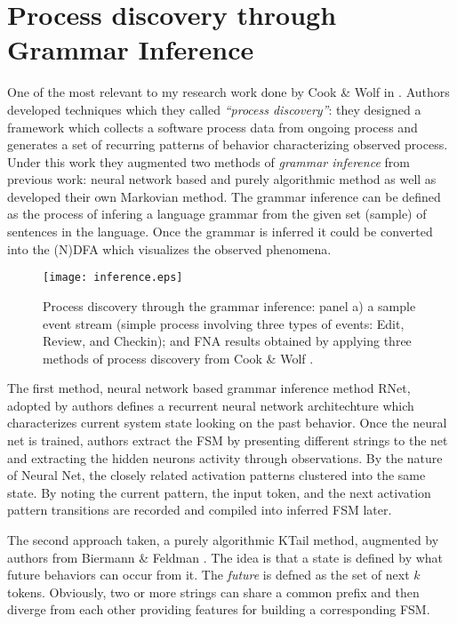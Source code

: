 \section{Process discovery through Grammar Inference}
One of the most relevant to my research work done by Cook \& Wolf in \cite{citeulike:328044}. Authors developed techniques which they called \textit{``process discovery''}: they designed a framework which collects a software process data from ongoing process and generates a set of recurring patterns of behavior characterizing observed process. Under this work they augmented two methods of \textit{grammar inference} from previous work: neural network based and purely algorithmic method as well as developed their own Markovian method. The grammar inference can be defined as the process of infering a language grammar from the given set (sample) of sentences in the language. Once the grammar is inferred it could be converted into the (N)DFA which visualizes the observed phenomena. 

\begin{figure}[tbp]
   \centering
   \texttt{[image: inference.eps]}
   \caption{Process discovery through the grammar inference: panel a) a sample event stream (simple process involving three types of events: Edit, Review, and Checkin); and FNA results obtained by applying three methods of process discovery from Cook \& Wolf \cite{citeulike:328044}.}
   \label{fig:inference}
\end{figure}

The first method, neural network based grammar inference method RNet, adopted by authors defines a recurrent neural network architechture which characterizes current system state looking on the past behavior. Once the neural net is trained, authors extract the FSM by presenting different strings to the net and extracting the hidden neurons activity through observations. By the nature of Neural Net, the closely related activation patterns clustered into the same state. By noting the current pattern, the input token, and the next activation pattern transitions are recorded and compiled into inferred FSM later.

The second approach taken, a purely algorithmic KTail method, augmented by authors from Biermann \& Feldman \cite{citeulike:5120603}. The idea is that a state is defined by what future behaviors can
occur from it. The \textit{future} is defned as the set of next $k$ tokens. Obviously, two or more strings can share a common prefix and then diverge from each other providing features for building a corresponding FSM.

